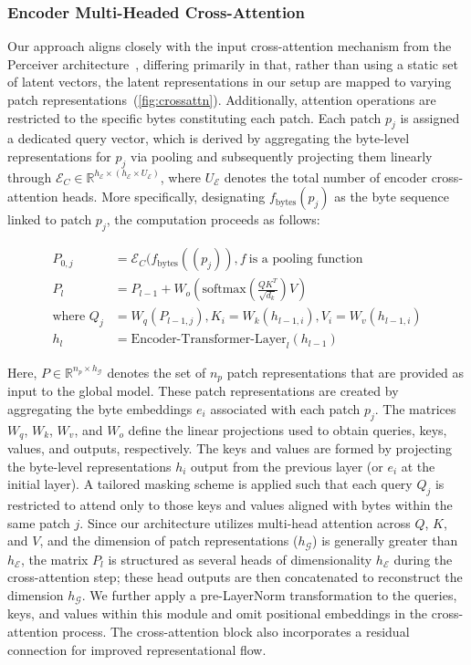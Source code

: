 \subsubsection{Encoder Multi-Headed Cross-Attention}
\label{sec:enc-cross-attn}
Our approach aligns closely with the input cross-attention mechanism from the Perceiver architecture~\citep{jaegle2021perceiver}, differing primarily in that, rather than using a static set of latent vectors, the latent representations in our setup are mapped to varying patch representations~(\autoref{fig:crossattn}). Additionally, attention operations are restricted to the specific bytes constituting each patch. Each patch $p_j$ is assigned a dedicated query vector, which is derived by aggregating the byte-level representations for $p_j$ via pooling and subsequently projecting them linearly through $\mathcal{E}_{C} \in \mathbb{R}^{h_{\mathcal{E}} \times (h_{\mathcal{E}} \times U_{\mathcal{E}})}$, where $U_{\mathcal{E}}$ denotes the total number of encoder cross-attention heads. More specifically, designating $f_{\text{bytes}}(p_j)$ as the byte sequence linked to patch $p_j$, the computation proceeds as follows:

\begin{align}
P_{0,j} &= \mathcal{E}_{C}(f_\text{bytes}((p_j)), f~ \text{is a pooling function} \\
P_l &= P_{l-1} + W_o\left(\text{softmax}\left(\frac{QK^T}{\sqrt{d_k}}\right)V\right) \\
\text{where } Q_j &= W_q(P_{l-1,j}), K_i = W_k(h_{l-1,i}), V_i = W_v(h_{l-1,i}) \\
h_l &= \text{Encoder-Transformer-Layer}_l(h_{l-1})
\end{align}

Here, $P \in \mathbb{R}^{n_p \times h_{\mathcal{G}}}$ denotes the set of $n_p$ patch representations that are provided as input to the global model. These patch representations are created by aggregating the byte embeddings $e_i$ associated with each patch $p_j$. The matrices $W_q$, $W_k$, $W_v$, and $W_o$ define the linear projections used to obtain queries, keys, values, and outputs, respectively. The keys and values are formed by projecting the byte-level representations $h_i$ output from the previous layer (or $e_i$ at the initial layer). A tailored masking scheme is applied such that each query $Q_j$ is restricted to attend only to those keys and values aligned with bytes within the same patch $j$. Since our architecture utilizes multi-head attention across $Q$, $K$, and $V$, and the dimension of patch representations ($h_{\mathcal{G}}$) is generally greater than $h_{\mathcal{E}}$, the matrix $P_l$ is structured as several heads of dimensionality $h_{\mathcal{E}}$ during the cross-attention step; these head outputs are then concatenated to reconstruct the dimension $h_{\mathcal{G}}$. We further apply a pre-LayerNorm transformation to the queries, keys, and values within this module and omit positional embeddings in the cross-attention process. The cross-attention block also incorporates a residual connection for improved representational flow.

